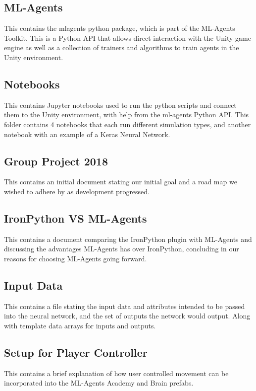 \subsection{ML-Agents}
This contains the mlagents python package, which is part of the ML-Agents Toolkit. This is a Python API that allows direct interaction with the Unity game engine as well as a collection of trainers and algorithms to train agents in the Unity environment.


\subsection{Notebooks}
This contains Jupyter notebooks used to run the python scripts and connect them to the Unity environment, with help from the ml-agents Python API. This folder contains 4 notebooks that each run different simulation types, and another notebook with an example of a Keras Neural Network. 


\subsection{Group Project 2018}
This contains an initial document stating our initial goal and a road map we wished to adhere by as development progressed.

\subsection{IronPython VS ML-Agents}
This contains a document comparing the IronPython plugin with ML-Agents and discussing the advantages ML-Agents has over IronPython, concluding in our reasons for choosing ML-Agents going forward.

\subsection{Input Data}
This contains a file stating the input data and attributes intended to be passed into the neural network, and the set of outputs the network would output. Along with template data arrays for inputs and outputs.


\subsection{Setup for Player Controller}
This contains a brief explanation of how user controlled movement can be incorporated into the ML-Agents Academy and Brain prefabs.

